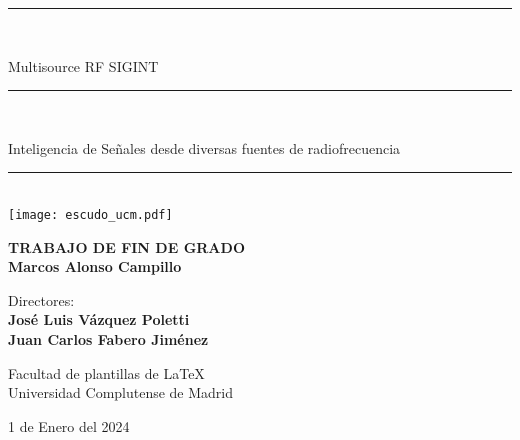 \begin{titlepage}
	\thispagestyle{empty}

	\begin{center}

		\vspace{1cm}

		\vspace{0.65cm}
		\rule{2in}{0.5pt}\\
		\vspace{0.85cm}

		{\Large Multisource RF SIGINT}\\

		\vspace{0.65cm}
		\rule{2in}{0.5pt}\\
		\vspace{0.85cm}

		{\Large Inteligencia de Señales desde diversas fuentes de radiofrecuencia}\\

		\vspace{0.65cm}
		\rule{2in}{0.5pt}\\
		

		\vfill
		\texttt{[image: escudo\_ucm.pdf]}
		\vfill

		

		\textbf{TRABAJO DE FIN DE GRADO}\\
		\vspace{0.7cm}
		\textbf{Marcos Alonso Campillo}

		\vspace{1cm}

		Directores:\\
		\textbf{José Luis Vázquez Poletti}\\
		\textbf{Juan Carlos Fabero Jiménez}

		\vspace{1.8cm}
		Facultad de plantillas de \LaTeX\\
		Universidad Complutense de Madrid
		\vspace{0.5cm}
	   
		1 de Enero del 2024

		\vspace{0.2cm}

	\end{center}
\end{titlepage}